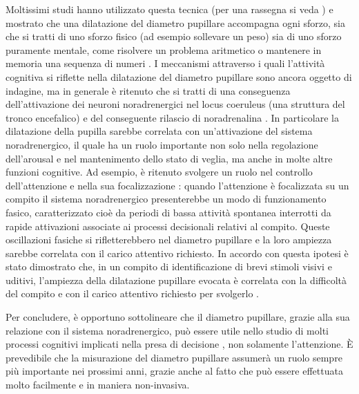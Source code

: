 \documentclass[12pt]{article}
\begin{document}
Moltissimi studi hanno utilizzato questa tecnica (per una rassegna si veda \cite{Beatty2000}) e mostrato che una dilatazione del diametro pupillare accompagna ogni sforzo, sia che si tratti di uno sforzo fisico (ad esempio sollevare un peso) sia di uno sforzo puramente mentale, come risolvere un problema aritmetico \cite{Hess1964} o mantenere in memoria una sequenza di numeri \cite{Kahneman1966}. I meccanismi attraverso i quali l'attività cognitiva si riflette nella dilatazione del diametro pupillare sono ancora oggetto di indagine, ma in generale è ritenuto che si tratti di una conseguenza dell'attivazione dei neuroni noradrenergici nel locus coeruleus (una struttura del tronco encefalico) e del conseguente rilascio di noradrenalina \cite{Aston-Jones2005}. In particolare la dilatazione della pupilla sarebbe correlata con un'attivazione del sistema noradrenergico, il quale ha un ruolo importante non solo nella regolazione dell'arousal e nel mantenimento dello stato di veglia, ma anche in molte altre funzioni cognitive. Ad esempio, è ritenuto svolgere un ruolo nel controllo dell'attenzione e nella sua focalizzazione \cite{Corbetta2008}: quando l'attenzione è focalizzata su un compito il sistema noradrenergico presenterebbe un modo di funzionamento fasico, caratterizzato cioè da periodi di bassa attività spontanea interrotti da rapide attivazioni associate ai processi decisionali relativi al compito. Queste oscillazioni fasiche si rifletterebbero nel diametro pupillare e la loro ampiezza sarebbe correlata con il carico attentivo richiesto. In accordo con questa ipotesi è stato dimostrato che, in un compito di identificazione di brevi stimoli visivi e uditivi, l'ampiezza della dilatazione pupillare evocata è correlata con la difficoltà del compito e con il carico attentivo richiesto per svolgerlo \cite{Lisi2015b}. 

Per concludere, è opportuno sottolineare che il diametro pupillare, grazie alla sua relazione con il sistema noradrenergico, può essere utile nello studio di molti processi cognitivi implicati nella presa di decisione \cite{Nieuwenhuis2005}, non solamente l'attenzione. È prevedibile che la misurazione del diametro pupillare assumerà un ruolo sempre più importante nei prossimi anni, grazie anche al fatto che può essere effettuata molto facilmente e in maniera non-invasiva.
\end{document}
